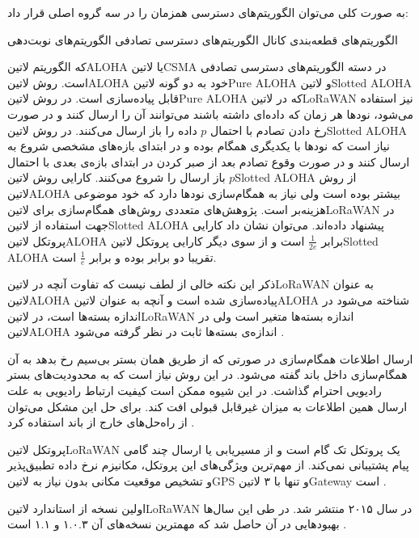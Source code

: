 به صورت کلی می‌توان الگوریتم‌های دسترسی همزمان را در سه گروه اصلی قرار داد:

 الگوریتم‌های قطعه‌بندی کانال
 الگوریتم‌های دسترسی تصادفی
 الگوریتم‌های نوبت‌دهی

که الگوریتم ‌لاتین{ALOHA} یا ‌لاتین{CSMA} در دسته الگوریتم‌های دسترسی تصادفی است. روش ‌لاتین{ALOHA} خود به دو گونه ‌لاتین{Pure ALOHA} و ‌لاتین{Slotted ALOHA}
قابل پیاده‌سازی است. در روش ‌لاتین{Pure ALOHA} که در ‌لاتین{LoRaWAN} نیز استفاده می‌شود، نودها هر زمان که داده‌ای داشته باشند می‌توانند آن را ارسال کنند و در صورت رخ دادن تصادم
با احتمال $p$ داده را باز ارسال می‌کنند. در روش ‌لاتین{Slotted ALOHA} نیاز است که نودها با یکدیگری همگام بوده و در ابتدای بازه‌های مشخصی شروع به ارسال کنند و در صورت
وقوع تصادم بعد از صبر کردن در ابتدای بازه‌ی بعدی با احتمال $p$ باز ارسال را شروع می‌کنند. کارایی روش ‌لاتین{Slotted ALOHA} از روش ‌لاتین{ALOHA} بیشتر بوده است ولی نیاز به همگام‌سازی نودها دارد
که خود موضوعی هزینه‌بر است. پژوهش‌های متعددی روش‌های همگام‌سازی برای ‌لاتین{LoRaWAN} در جهت استفاده از ‌لاتین{Slotted ALOHA} پیشنهاد داده‌اند.
می‌توان نشان داد کارایی پروتکل ‌لاتین{ALOHA} برابر $\frac{1}{2e}$ است و از سوی دیگر کارایی پروتکل ‌لاتین{Slotted ALOHA} تقریبا دو برابر بوده و برابر $\frac{1}{e}$ است.

ذکر این نکته خالی از لطف نیست که تفاوت آنچه در ‌لاتین{LoRaWAN} به عنوان ‌لاتین{ALOHA} پیاده‌سازی شده است و آنچه به عنوان ‌لاتین{ALOHA} شناخته می‌شود در اندازه بسته‌ها است،
در ‌لاتین{LoRaWAN} اندازه بسته‌ها متغیر است ولی در ‌لاتین{ALOHA} اندازه‌ی بسته‌ها ثابت در نظر گرفته می‌شود
.

ارسال اطلاعات همگام‌سازی در صورتی که از طریق همان بستر بی‌سیم رخ بدهد به آن همگام‌سازی داخل باند گفته می‌شود. در این روش نیاز است که به محدودیت‌های بستر رادیویی احترام گذاشت.
در این شیوه ممکن است کیفیت ارتباط رادیویی به علت ارسال همین اطلاعات به میزان غیرقابل قبولی افت کند. برای حل این مشکل می‌توان از راه‌حل‌های خارج از باند استفاده کرد
.

پروتکل ‌لاتین{LoRaWAN} یک پروتکل تک گام است و از مسیریابی یا ارسال چند گامی پیام پشتیبانی نمی‌کند. از مهم‌ترین ویژگی‌های این پروتکل، مکانیزم نرخ داده تطبیق‌پذیر و تشخیص
موقعیت مکانی بدون نیاز به ‌لاتین{GPS} و تنها با ۳ ‌لاتین{Gateway} است
.

اولین نسخه از استاندارد ‌لاتین{LoRaWAN} در سال ۲۰۱۵ منتشر شد. در طی این سال‌ها بهبودهایی در آن حاصل شد که مهمترین نسخه‌های آن ۱.۰.۳ و ۱.۱ است
.

